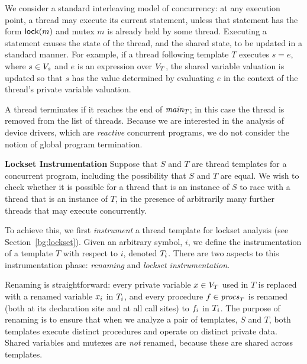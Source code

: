 We consider a standard interleaving model of concurrency: at any execution point, a thread may execute its current statement, unless that statement has the form $\mathsf{lock}(m)$ and mutex $m$ is already held by some thread.  Executing a statement causes the state of the thread, and the shared state, to be updated in a standard manner.  For example, if a thread following template $T$ executes $s = e$, where $s \in V_s$ and $e$ is an expression over $V_{T}$, the shared variable valuation is updated so that $s$ has the value determined by evaluating $e$ in the context of the thread's private variable valuation.

A thread terminates if it reaches the end of $\mathit{main}_{T}$; in this case the thread is removed from the list of threads.  Because we are interested in the analysis of device drivers, which are \emph{reactive} concurrent programs, we do not consider the notion of global program termination.

\medskip\noindent\textbf{Lockset Instrumentation }
%
Suppose that $S$ and $T$ are thread templates for a concurrent program, including the possibility that $S$ and $T$ are equal. We wish to check whether it is possible for a thread that is an instance of $S$ to race with a thread that is an instance of $T$, in the presence of arbitrarily many further threads that may execute concurrently.

To achieve this, we first \emph{instrument} a thread template for lockset analysis (see Section~\ref{bg:lockset}).  Given an arbitrary symbol, $i$, we define the instrumentation of a template $T$ with respect to $i$, denoted $T_{i}$.  There are two aspects to this instrumentation phase: \emph{renaming} and \emph{lockset instrumentation}.

 Renaming is straightforward: every private variable $x \in V_{T}$ used in $T$ is replaced with a renamed variable $x_{i}$ in $T_{i}$, and every procedure $f \in \mathit{procs}_{T}$ is renamed (both at its declaration site and at all call sites) to $f_{i}$ in $T_{i}$.  The purpose of renaming is to ensure that when we analyze a pair of templates, $S$ and $T$, both templates execute distinct procedures and operate on distinct private data.  Shared variables and mutexes are \emph{not} renamed, because these are shared across templates.

